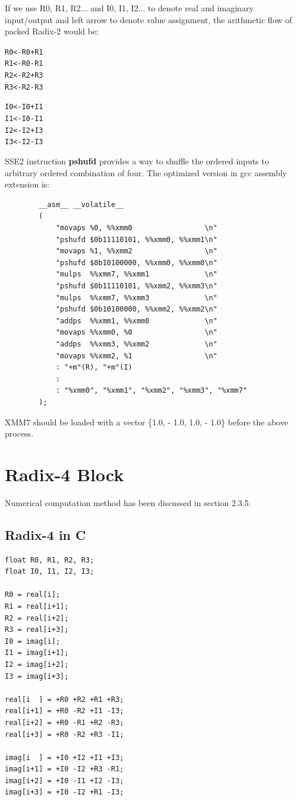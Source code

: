 \documentclass[a4paper]{report}
\begin{document}
	If we use R0, R1, R2... and I0, I1, I2... to denote real and imaginary input/output and left arrow to denote value assignment, the arithmetic flow of packed Radix-2 would be:

\begin{alltt}
\centering
R0 <- R0 + R1
R1 <- R0 - R1
R2 <- R2 + R3
R3 <- R2 - R3

I0 <- I0 + I1
I1 <- I0 - I1
I2 <- I2 + I3
I3 <- I2 - I3
\end{alltt}

	SSE2 instruction \textbf{pshufd} provides a way to shuffle the ordered inputs to arbitrary ordered combination of four. The optimized version in gcc assembly extension is:

    \lstset{language = c, tabsize = 4}
    \begin{lstlisting}
        __asm__ __volatile__
        (
            "movaps %0, %%xmm0                 \n"
            "pshufd $0b11110101, %%xmm0, %%xmm1\n"
            "movaps %1, %%xmm2                 \n"
            "pshufd $0b10100000, %%xmm0, %%xmm0\n"
            "mulps  %%xmm7, %%xmm1             \n"
            "pshufd $0b11110101, %%xmm2, %%xmm3\n"
            "mulps  %%xmm7, %%xmm3             \n"
            "pshufd $0b10100000, %%xmm2, %%xmm2\n"
            "addps  %%xmm1, %%xmm0             \n"
            "movaps %%xmm0, %0                 \n"
            "addps  %%xmm3, %%xmm2             \n"
            "movaps %%xmm2, %1                 \n"
            : "+m"(R), "+m"(I)
            :
            : "%xmm0", "%xmm1", "%xmm2", "%xmm3", "%xmm7"
        );
    \end{lstlisting}
    
    XMM7 should be loaded with a vector \{1.0, - 1.0, 1.0, - 1.0\} before the above process.

\section{Radix-4 Block} \indent

	Numerical computation method has been discussed in section 2.3.5.

\subsection{Radix-4 in C} \indent

    \lstset{language = c, tabsize = 4}
    \begin{lstlisting}
float R0, R1, R2, R3;
float I0, I1, I2, I3;

R0 = real[i];
R1 = real[i+1];
R2 = real[i+2];
R3 = real[i+3];
I0 = imag[i];
I1 = imag[i+1];
I2 = imag[i+2];
I3 = imag[i+3];

real[i  ] = +R0 +R2 +R1 +R3;
real[i+1] = +R0 -R2 +I1 -I3;
real[i+2] = +R0 -R1 +R2 -R3;
real[i+3] = +R0 -R2 +R3 -I1;

imag[i  ] = +I0 +I2 +I1 +I3;
imag[i+1] = +I0 -I2 +R3 -R1;
imag[i+2] = +I0 -I1 +I2 -I3;
imag[i+3] = +I0 -I2 +R1 -I3;
    \end{lstlisting}
\end{document}
